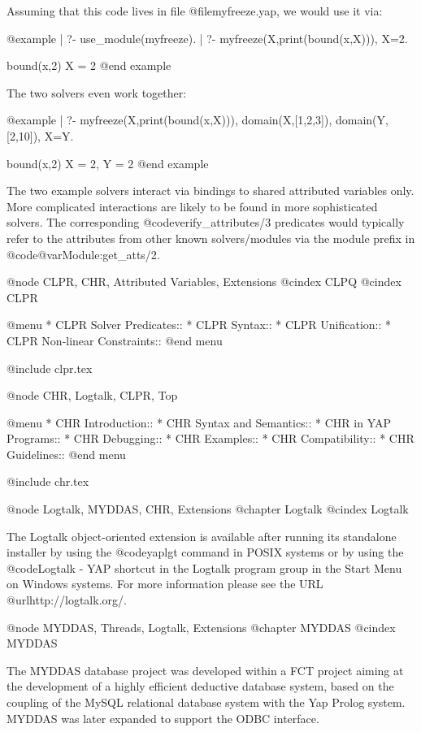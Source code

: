 {{{{{{{{{Assuming that this code lives in file @file{myfreeze.yap},
we would use it via:

@example
| ?- use_module(myfreeze).
| ?- myfreeze(X,print(bound(x,X))), X=2.

bound(x,2)                      %
X = 2                           %
@end example

The two solvers even work together:

@example
| ?- myfreeze(X,print(bound(x,X))), domain(X,[1,2,3]),
     domain(Y,[2,10]), X=Y.

bound(x,2)                      %
X = 2,                          %
Y = 2
@end example

The two example solvers interact via bindings to shared attributed
variables only.  More complicated interactions are likely to be found
in more sophisticated solvers.  The corresponding
@code{verify_attributes/3} predicates would typically refer to the
attributes from other known solvers/modules via the module prefix in
@code{@var{Module}:get_atts/2}.

@node CLPR, CHR, Attributed Variables, Extensions
@cindex CLPQ
@cindex CLPR

@menu
* CLPR Solver Predicates::
* CLPR Syntax::
* CLPR Unification::
* CLPR Non-linear Constraints::               
@end menu

@include clpr.tex

@node CHR, Logtalk, CLPR, Top

@menu
* CHR Introduction::            
* CHR Syntax and Semantics::
* CHR in YAP Programs::
* CHR Debugging::               
* CHR Examples::       
* CHR Compatibility::     
* CHR Guidelines::  
@end menu

@include chr.tex

@node Logtalk, MYDDAS, CHR, Extensions
@chapter Logtalk
@cindex Logtalk

The Logtalk object-oriented extension is available after running its 
standalone installer by using the @code{yaplgt} command in POSIX 
systems or by using the @code{Logtalk - YAP} shortcut in the Logtalk 
program group in the Start Menu on Windows systems. For more information 
please see the URL @url{http://logtalk.org/}.

@node MYDDAS, Threads, Logtalk, Extensions
@chapter MYDDAS
@cindex MYDDAS

The MYDDAS database project was developed within a FCT project aiming at
the development of a highly efficient deductive database system, based
on the coupling of the MySQL relational database system with the Yap
Prolog system. MYDDAS was later expanded to support the ODBC interface.

}}}}}}}}}
